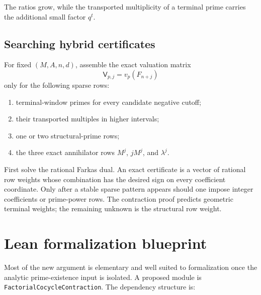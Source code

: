 \documentclass[11pt,oneside]{article}
\theoremstyle{definition}
\theoremstyle{remark}
\begin{document}
The ratios grow, while the transported multiplicity of a terminal prime carries the
additional small factor $q^t$.

\subsection{Searching hybrid certificates}

For fixed $(M,A,n,d)$, assemble the exact valuation matrix
\[
 \mathsf V_{p,j}=v_p(F_{n+j})
\]
only for the following sparse rows:

\begin{enumerate}
\item terminal-window primes for every candidate negative cutoff;
\item their transported multiples in higher intervals;
\item one or two structural-prime rows;
\item the three exact annihilator rows $M^j$, $jM^j$, and $\lambda^j$.
\end{enumerate}

First solve the rational Farkas dual.  An exact certificate is a vector of rational row
weights whose combination has the desired sign on every coefficient coordinate.  Only after
a stable sparse pattern appears should one impose integer coefficients or prime-power rows.
The contraction proof predicts geometric terminal weights; the remaining unknown is the
structural row weight.

\section{Lean formalization blueprint}
\label{sec:lean}

Most of the new argument is elementary and well suited to formalization once the analytic
prime-existence input is isolated.  A proposed module is
\texttt{FactorialCocycleContraction}.  The dependency structure is:
\end{document}
